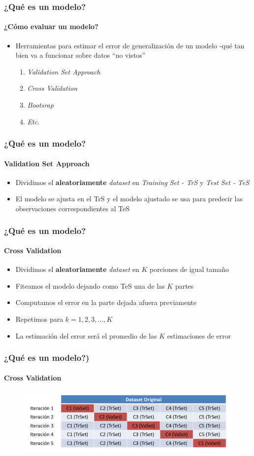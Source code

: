 \documentclass{beamer}
\begin{document}
\begin{frame}
	\frametitle{¿Qué es un modelo?}
	\framesubtitle{¿Cómo evaluar un modelo?}
	\begin{itemize}
		\item{Herramientas para estimar el error de generalización de un modelo -qué tan bien va a funcionar sobre datos ``no vistos''}
		\begin{enumerate}
			\item{\emph{Validation Set Approach}}
			\item{\emph{Cross Validation}}
			\item{\emph{Bootsrap}}
			\item{\emph{Etc.}}
		\end{enumerate}
	\end{itemize}
\end{frame}

\begin{frame}
	\frametitle{¿Qué es un modelo?}
	\framesubtitle{Validation Set Approach}
	\begin{itemize}
		\item{Dividimos el \textbf{aleatoriamente} \emph{dataset} en \emph{Training Set - TrS} y \emph{Test Set - TeS}}
		\item{El modelo se ajusta en el TrS y el modelo ajustado se usa para predecir las observaciones correspondientes al TeS}
	\end{itemize}
\end{frame}

\begin{frame}
	\frametitle{¿Qué es un modelo?}
	\framesubtitle{Cross Validation}
	\begin{itemize}
		\item{Dividimos el \textbf{aleatoriamente} \emph{dataset} en $K$ porciones de igual tamaño}
		\item{Fiteamos el modelo dejando como TeS una de las $K$ partes}
		\item{Computamos el error en la parte dejada afuera previamente}
		\item{Repetimos para $k=1,2,3,...,K$}
		\item{La estimación del error será el promedio de las $K$ estimaciones de error}
	\end{itemize}
\end{frame}

\begin{frame}
	\frametitle{¿Qué es un modelo?)}
	\framesubtitle{Cross Validation}
	\begin{figure}
		\centering
		\includegraphics[width=0.9\linewidth, height=0.5\textheight]{img/cv}
	\end{figure}
\end{frame}
\end{document}
